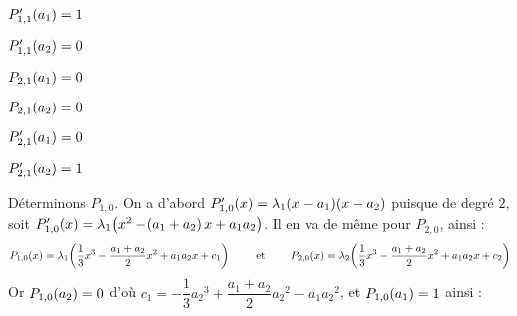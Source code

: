 \documentclass[a4paper,french,bookmarks]{article}
\begin{document}
\begin{enumerate}[resume]
\begin{enumerate}
{\begin{enumerate}
\begin{minipage}{0.2\linewidth}
                        \itt $P_{1, 1}'\!\left(a_1\right) = 1$
                        
                        \itt $P_{1, 1}'\!\left(a_2\right) = 0$
                    \end{minipage}
                    \hfill
                    \begin{minipage}{0.2\linewidth}
                        \itt $P_{2, 1}\!\left(a_1\right) = 0$
                        
                        \itt $P_{2, 1}\!\left(a_2\right) = 0$
                        
                        \itt $P_{2, 1}'\!\left(a_1\right) = 0$
                        
                        \itt $P_{2, 1}'\!\left(a_2\right) = 1$
                    \end{minipage}
                \end{enumerate}
                Déterminons $P_{1, 0}$. On a d'abord $P_{1, 0}'\!\left(x\right) = \lambda_1\!\left(x-a_1\right)\!\left(x-a_2\right)$ puisque de degré $2$, soit $P_{1, 0}'\!\left(x\right) = \lambda_1\!\left(x^2 -\!\left(a_1 + a_2\right)x + a_1a_2\right)$. Il en va de même pour $P_{2, 0}$, ainsi :
                \[ P_{1, 0}\!\left(x\right) = \lambda_1\!\left(\dfrac{1}{3}x^3 - \dfrac{a_1 + a_2}{2}x^2 + a_1a_2x + c_1\right) \qquad\ \text{et} \ \qquad P_{2, 0}\!\left(x\right) = \lambda_2\!\left(\dfrac{1}{3}x^3 - \dfrac{a_1 + a_2}{2}x^2 + a_1a_2x + c_2\right)\]
                Or $P_{1, 0}\!\left(a_2\right) = 0$ d'où $c_1 = -\dfrac{1}{3}{a_2}^3 + \dfrac{a_1 + a_2}{2}{a_2}^2 - a_1{a_2}^2$, et $P_{1, 0}\!\left(a_1\right) = 1$ ainsi :
            }
            \nobefore
            \boxansconc{
                \[ P_{1, 0}\p{x} = \dfrac{\frac{1}{3}\p{x^3 - {a_2}^3} + \frac{a_1 + a_2}{2}\p{{a_2}^2 - x^2} + a_1a_2\p{x - a_2}}{\frac{1}{3}\p{{a_1}^3 - {a_2}^3} + \frac{a_1 + a_2}{2}\p{{a_2}^2 - {a_1}^2} + a_1a_2\p{a_1 - a_2}}\]
            }
            \boxansconc{
                \[ P_{2, 0}\p{x} = \dfrac{\frac{1}{3}\p{x^3 - {a_1}^3} + \frac{a_1 + a_2}{2}\p{{a_1}^2 - x^2} + a_1a_2\p{x - a_1}}{\frac{1}{3}\p{{a_2}^3 - {a_1}^3} + \frac{a_1 + a_2}{2}\p{{a_1}^2 - {a_2}^2} + a_1a_2\p{a_2 - a_1}}\]
            }
\end{enumerate}
\end{enumerate}
\end{document}

